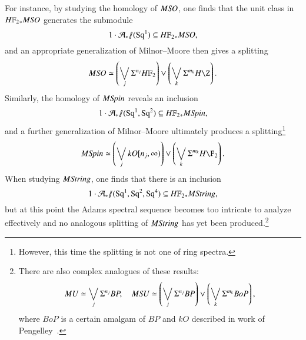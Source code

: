 For instance, by studying the homology of $M\mathit{SO}$, one finds that the unit class in $\HFtwo_* M\SO$ generates the submodule \[1 \cdot \mathcal A_* \mmod (\Sq^1) \subseteq \HFtwo_* M\SO,\] and an appropriate generalization of Milnor--Moore then gives a splitting \[M\SO \simeq \left( \bigvee_j \Susp^{n_j} \HFtwo \right) \vee \left( \bigvee_k \Susp^{m_k} H\Z \right).\]  Similarly, the homology of $M\mathit{Spin}$ reveals an inclusion~\cite{ABP,GiambalvoPengelley} \[1 \cdot \mathcal A_* \mmod (\Sq^1, \Sq^2) \subseteq \HFtwo_* M\Spin,\] and a further generalization of Milnor--Moore ultimately produces a splitting\footnote{However, this time the splitting is not one of ring spectra.} \[M\Spin \simeq \left( \bigvee_j kO[n_j, \infty)\right) \vee \left( \bigvee_k \Susp^{m_k} H\F_2 \right).\]  When studying $M\mathit{String}$, one finds that there is an inclusion \[1 \cdot \mathcal A_* \mmod (\Sq^1, \Sq^2, \Sq^4) \subseteq \HFtwo_* M\String,\] but at this point the Adams spectral sequence becomes too intricate to analyze effectively and no analogous splitting of $M\mathit{String}$ has yet been produced.\footnote{There are also complex analogues of these results:
\[
MU \simeq \bigvee_j \Sigma^{n_j} BP, \quad
M\mathit{SU} \simeq \left(\bigvee_j \Sigma^{n_j} BP\right) \vee \left(\bigvee_k \Sigma^{m_k} BoP \right),
\]
where $BoP$ is a certain amalgam of $BP$ and $kO$ described in work of Pengelley~\cite{Pengelley}.}

